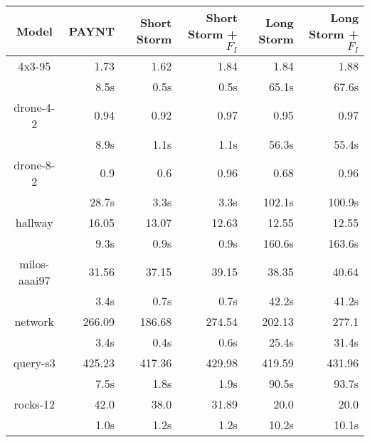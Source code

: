 \documentclass{article}
\begin{document}
\begin{table}
\begin{tabular}{|c|r|r|r|r|r|}
\hline

Model & PAYNT & Short Storm & Short Storm + $F_{I}$ & Long Storm & Long Storm + $F_{I}$ \\ \hline 

4x3-95 & 1.73 & 1.62 & 1.84 & 1.84 & 1.88 \\
 & 8.5s & 0.5s & 0.5s & 65.1s & 67.6s \\
\hline
drone-4-2 & 0.94 & 0.92 & 0.97 & 0.95 & 0.97 \\
 & 8.9s & 1.1s & 1.1s & 56.3s & 55.4s \\
\hline
drone-8-2 & 0.9 & 0.6 & 0.96 & 0.68 & 0.96 \\
 & 28.7s & 3.3s & 3.3s & 102.1s & 100.9s \\
\hline
hallway & 16.05 & 13.07 & 12.63 & 12.55 & 12.55 \\
 & 9.3s & 0.9s & 0.9s & 160.6s & 163.6s \\
\hline
milos-aaai97 & 31.56 & 37.15 & 39.15 & 38.35 & 40.64 \\
 & 3.4s & 0.7s & 0.7s & 42.2s & 41.2s \\
\hline
network & 266.09 & 186.68 & 274.54 & 202.13 & 277.1 \\
 & 3.4s & 0.4s & 0.6s & 25.4s & 31.4s \\
\hline
query-s3 & 425.23 & 417.36 & 429.98 & 419.59 & 431.96 \\
 & 7.5s & 1.8s & 1.9s & 90.5s & 93.7s \\
\hline
rocks-12 & 42.0 & 38.0 & 31.89 & 20.0 & 20.0 \\
 & 1.0s & 1.2s & 1.2s & 10.2s & 10.1s \\
\hline
\end{tabular}
\end{table}
\end{document}
